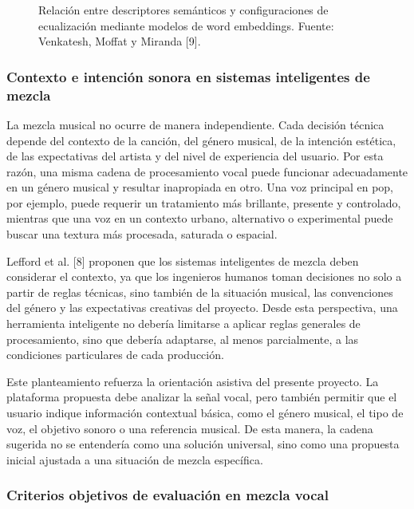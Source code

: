 \documentclass[12pt]{article}
\begin{document}
\begin{figure}[h!]
\centering
\caption{Relación entre descriptores semánticos y configuraciones de ecualización mediante modelos de word embeddings. Fuente: Venkatesh, Moffat y Miranda [9].}
\label{fig:fig6}
\end{figure}

\subsubsection*{Contexto e intención sonora en sistemas inteligentes de mezcla}

La mezcla musical no ocurre de manera independiente. Cada decisión técnica depende del contexto de la canción, del género musical, de la intención estética, de las expectativas del artista y del nivel de experiencia del usuario. Por esta razón, una misma cadena de procesamiento vocal puede funcionar adecuadamente en un género musical y resultar inapropiada en otro. Una voz principal en pop, por ejemplo, puede requerir un tratamiento más brillante, presente y controlado, mientras que una voz en un contexto urbano, alternativo o experimental puede buscar una textura más procesada, saturada o espacial.

Lefford et al. [8] proponen que los sistemas inteligentes de mezcla deben considerar el contexto, ya que los ingenieros humanos toman decisiones no solo a partir de reglas técnicas, sino también de la situación musical, las convenciones del género y las expectativas creativas del proyecto. Desde esta perspectiva, una herramienta inteligente no debería limitarse a aplicar reglas generales de procesamiento, sino que debería adaptarse, al menos parcialmente, a las condiciones particulares de cada producción.

Este planteamiento refuerza la orientación asistiva del presente proyecto. La plataforma propuesta debe analizar la señal vocal, pero también permitir que el usuario indique información contextual básica, como el género musical, el tipo de voz, el objetivo sonoro o una referencia musical. De esta manera, la cadena sugerida no se entendería como una solución universal, sino como una propuesta inicial ajustada a una situación de mezcla específica.

\subsubsection*{Criterios objetivos de evaluación en mezcla vocal}
\end{document}
